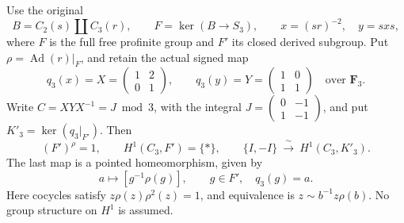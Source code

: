 Use the original
\[
 B=C_2(s)\amalg C_3(r),\qquad F=\ker(B\longrightarrow S_3),
 \qquad x=(sr)^{-2},\quad y=sxs,
\]
where \(F\) is the full free profinite group and \(F'\) its closed
derived subgroup. Put \(\rho=\operatorname{Ad}(r)|_F\), and retain
the actual signed map
\[
 q_3(x)=X=\begin{pmatrix}1&2\\0&1\end{pmatrix},\qquad
 q_3(y)=Y=\begin{pmatrix}1&0\\1&1\end{pmatrix}
 \quad\text{over }\mathbf F_3.
\]
Write \(C=XYX^{-1}=J\bmod3\), with the integral
\(J=\left(\begin{smallmatrix}0&-1\\1&-1\end{smallmatrix}\right)\),
and put \(K'_3=\ker(q_3|_{F'})\). Then
\[
 (F')^\rho=1,\qquad H^1(C_3,F')=\{*\},\qquad
 \{I,-I\}\ \xrightarrow{\ \sim\ }\ H^1(C_3,K'_3).
 \tag{A.109.1}
\]
The last map is a pointed homeomorphism, given by
\[
 a\longmapsto[g^{-1}\rho(g)],\qquad
 g\in F',\quad q_3(g)=a.
 \tag{A.109.2}
\]
Here cocycles satisfy \(z\rho(z)\rho^2(z)=1\), and equivalence is
\(z\sim b^{-1}z\rho(b)\). No group structure on \(H^1\) is assumed.

